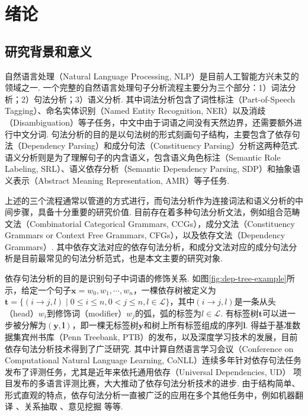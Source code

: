 \chapter{绪论}
\label{cha:intro}

\section{研究背景和意义}

自然语言处理（Natural Language Processing, NLP）是目前人工智能方兴未艾的领域之一.
一个完整的自然语言处理句子分析流程主要分为三个部分：1）词法分析；2）句法分析；3）语义分析\cite{zhang-2014-chinese-joint}.
其中词法分析包含了词性标注（Part-of-Speech Tagging）、命名实体识别（Named Entity Recognition, NER）以及消歧（Disambiguation）等子任务，中文中由于词语之间没有天然边界，还需要额外进行中文分词.
句法分析的目的是以句法树的形式刻画句子结构，主要包含了依存句法（Dependency Parsing）和成分句法（Constituency Parsing）分析这两种范式.
语义分析则是为了理解句子的内含语义，包含语义角色标注（Semantic Role Labeling, SRL）、语义依存分析（Semantic Dependency Parsing, SDP）和抽象语义表示（Abstract Meaning Representation, AMR）等子任务.

上述的三个流程通常以管道的方式进行，而句法分析作为连接词法和语义分析的中间步骤，具备十分重要的研究价值.
目前存在着多种句法分析文法，例如组合范畴文法（Combinatorial Categorical Grammars, CCGs），成分文法（Constituency Grammars or Context Free Grammars, CFGs），以及依存文法（Dependency Grammars）.
其中依存文法对应的依存句法分析，和成分文法对应的成分句法分析是目前最常见的句法分析范式，也是本文主要的研究对象.


依存句法分析的目的是识别句子中词语的修饰关系.
如图\ref{fig:dep-tree-example}所示，给定一个句子$\boldsymbol{x}=w_0,w_1,\cdots,w_n$，一棵依存树被定义为$\boldsymbol{t}=\{(i\rightarrow j,l)\mid 0\le i \le n,0 < j \le n,l \in \mathcal{L}\}$，其中$(i\rightarrow j,l)$是一条从头（head）$w_i$到修饰词（modifier）$w_j$的弧，弧的标签为$l \in \mathcal{L}$.
有标签树$\boldsymbol{t}$可以进一步被分解为$(\boldsymbol{y},\boldsymbol{l})$，即一棵无标签树$\boldsymbol{y}$和树上所有标签组成的序列$\boldsymbol{l}$.
得益于基准数据集宾州书库（Penn Treebank, PTB）的发布，以及深度学习技术的发展，目前依存句法分析技术得到了广泛研究\cite{li-2013-chinese-dep}.
其中计算自然语言学习会议（Conference on Computational Natural Language Learning, CoNLL）连续多年针对依存句法任务发布了评测任务，尤其是近年来依托通用依存（Universal Dependencies, UD） \citep{nivre-etal-2017-universal}项目发布的多语言评测比赛，大大推动了依存句法分析技术的进步.
由于结构简单、形式直观的特点，依存句法分析一直被广泛的应用在多个其他任务中，例如机器翻译 \citep{zhang-etal-2019-syntax}、关系抽取 \citep{song-etal-2019-leveraging}、意见挖掘 \citep{zhang-etal-2020-syntax}等等.


